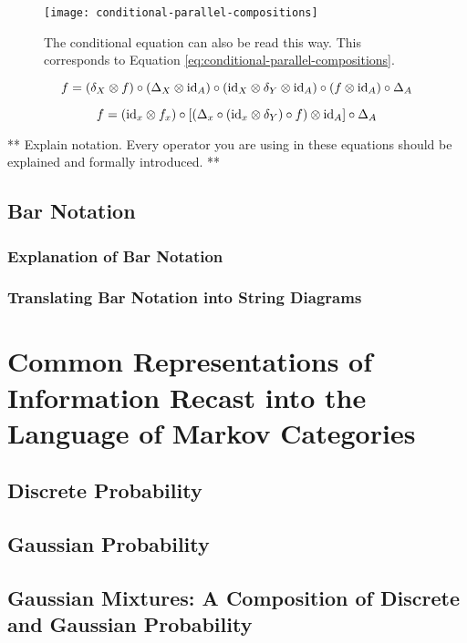 \begin{figure}[htb]
	\centering
	\texttt{[image: conditional-parallel-compositions]}
	\caption{The conditional equation can also be read this way. This corresponds to Equation \ref{eq:conditional-parallel-compositions}.}
	\label{fig:conditional-parallel-compositions}
\end{figure}

\begin{equation}
\label{eq:conditional-compositions}
f = (\delta_X \otimes f) \circ (\Delta_X \otimes \mathrm{id}_A)
\circ (\mathrm{id}_X \otimes \delta_Y \otimes \mathrm{id}_A) \circ (f \otimes \mathrm{id}_A) \circ \Delta_A
\end{equation}

\begin{equation}
\label{eq:conditional-parallel-compositions}
f = (\mathrm{id}_x \otimes f_x) \circ \left[\left(\Delta_x \circ (\mathrm{id}_x\otimes \delta_Y) \circ f\right) \otimes \mathrm{id}_A\right] \circ \Delta_A
\end{equation}

** Explain notation. Every operator you are using in these equations should be explained and formally introduced. **

\section{Bar Notation}
\subsection{Explanation of Bar Notation}
\subsection{Translating Bar Notation into String Diagrams}

\chapter{Common Representations of Information Recast into the Language of Markov Categories}
\section{Discrete Probability}
\section{Gaussian Probability}
\section{Gaussian Mixtures: A Composition of Discrete and Gaussian Probability}
